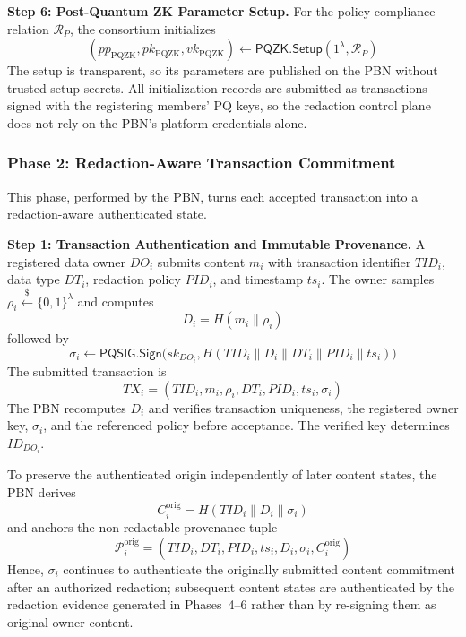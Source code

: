 \documentclass[lettersize,journal]{IEEEtran}
\begin{document}
\textbf{Step 6: Post-Quantum ZK Parameter Setup.}
For the policy-compliance relation $\mathcal{R}_P$, the consortium
initializes
\begin{equation}
(pp_{\mathrm{PQZK}},pk_{\mathrm{PQZK}},vk_{\mathrm{PQZK}})
\leftarrow
\mathsf{PQZK.Setup}(1^\lambda,\mathcal{R}_P)
\end{equation}
The setup is transparent, so its parameters are published on the PBN
without trusted setup secrets. All initialization records are submitted
as transactions signed with the registering members' PQ keys, so the
redaction control plane does not rely on the PBN's platform credentials
alone.
    
    
    
   \subsubsection*{\textbf{Phase 2: Redaction-Aware Transaction Commitment}}

This phase, performed by the PBN, turns each accepted transaction into
a redaction-aware authenticated state.

\medskip
\noindent\textbf{Step 1: Transaction Authentication and Immutable
Provenance.}
A registered data owner $DO_i$ submits content $m_i$ with transaction
identifier $TID_i$, data type $DT_i$, redaction policy $PID_i$, and
timestamp $ts_i$. The owner samples
$\rho_i\stackrel{\$}{\leftarrow}\{0,1\}^{\lambda}$ and computes
\begin{equation}
D_i=H(m_i\parallel\rho_i)
\end{equation}
followed by
\begin{equation}
\sigma_i\leftarrow
\mathsf{PQSIG.Sign}\big(
sk_{DO_i},
H(TID_i\parallel D_i\parallel DT_i\parallel PID_i\parallel ts_i)\big)
\end{equation}
The submitted transaction is
\begin{equation}
TX_i=(TID_i,m_i,\rho_i,DT_i,PID_i,ts_i,\sigma_i)
\end{equation}
The PBN recomputes $D_i$ and verifies transaction uniqueness, the
registered owner key, $\sigma_i$, and the referenced policy before
acceptance. The verified key determines $ID_{DO_i}$.

To preserve the authenticated origin independently of later content
states, the PBN derives
\begin{equation}
C_i^{\mathrm{orig}}
=
H(TID_i\parallel D_i\parallel\sigma_i)
\end{equation}
and anchors the non-redactable provenance tuple
\begin{equation}
\mathcal{P}_i^{\mathrm{orig}}
=
(TID_i,DT_i,PID_i,ts_i,D_i,\sigma_i,C_i^{\mathrm{orig}})
\end{equation}
Hence, $\sigma_i$ continues to authenticate the originally submitted
content commitment after an authorized redaction; subsequent content
states are authenticated by the redaction evidence generated in
Phases~4--6 rather than by re-signing them as original owner content.
\end{document}
